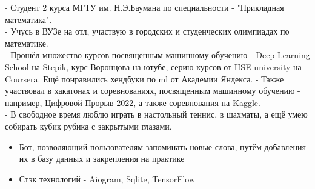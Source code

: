 \documentclass[10pt,a4paper,ragged2e,withhyper]{altacv}
\begin{document}
\begin{paracol}{2}

- Студент 2 курса МГТУ им. Н.Э.Баумана по специальности - "Прикладная математика".\\
- Учусь в ВУЗе на отл, участвую в городских и студенческих олимпиадах по математике.\\
- Прошёл множество курсов посвященным машинному обучению - Deep Learning School на Stepik, курс Воронцова на ютубе, серию курсов от HSE university на Coursera. Ещё понравились хендбуки по ml от Академии Яндекса.\newline
- Также участвовал в хакатонах и соревнованиях, посвященным машинному обучению - например, Цифровой Прорыв 2022, а также соревнования на Kaggle.\\
- В свободное время люблю играть в настольный теннис, в шахматы, а ещё умею собирать кубик рубика с закрытыми глазами.


\begin{itemize}
\item Бот, позволяющий пользователям запоминать новые слова, путём добавления их в базу данных 
и закрепления на практике
\item Стэк технологий - Aiogram, Sqlite, TensorFlow
\end{itemize}


\medskip





\divider




\end{paracol}
\end{document}
